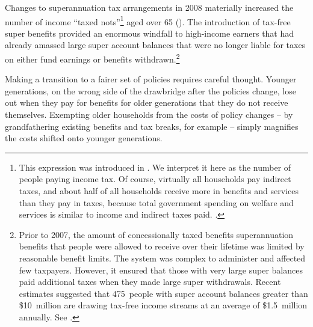 \documentclass[continuous]{grattan}\usepackage[]{graphicx}\usepackage[]{color}
\begin{document}
Changes to superannuation tax arrangements in 2008 materially increased the number of income “taxed nots”\footnote{%
This expression was introduced in \textcite{Morrison-2016-have-havenots-speech}. 
We interpret it here as the number of people paying income tax. 
Of course, virtually all households pay indirect taxes, and about half of all households receive more in benefits and services than they pay in taxes, because total government spending on welfare and services is similar to income and indirect taxes paid. 
\textcite{Jericho-theGuardian-on-Morrisons-have-havenots-speech}.%
}  aged over 65 (). %
The introduction of tax-free super benefits provided an enormous windfall to high-income earners that had already amassed large super account balances that were no longer liable for taxes on either fund earnings or benefits withdrawn.\footnote{%
Prior to 2007, the amount of concessionally taxed benefits superannuation benefits that people were allowed to receive over their lifetime was limited by reasonable benefit limits. 
The system was complex to administer and affected few taxpayers. 
However, it ensured that those with very large super balances paid additional taxes when they made large super withdrawals. 
Recent \ASFA{} estimates suggested that 475~people with super account balances greater than \$10~million are drawing tax-free income streams at an average of \$1.5~million annually. See \textcites[][10]{Parl-Lib-2005-Super-ready-reckoner-multiple-rules-for-200506}[][106]{Super-Select-Committee-2002-Super-standards-living-retirement}[][4]{Clare2015-Super-high-account-bals}.}

Making a transition to a fairer set of policies requires careful thought. 
Younger generations, on the wrong side of the drawbridge after the policies change, lose out when they pay for benefits for older generations that they do not receive themselves. 
Exempting older households from the costs of policy changes – by grandfathering existing benefits and tax breaks, for example – simply magnifies the costs shifted onto younger generations.
\end{document}
